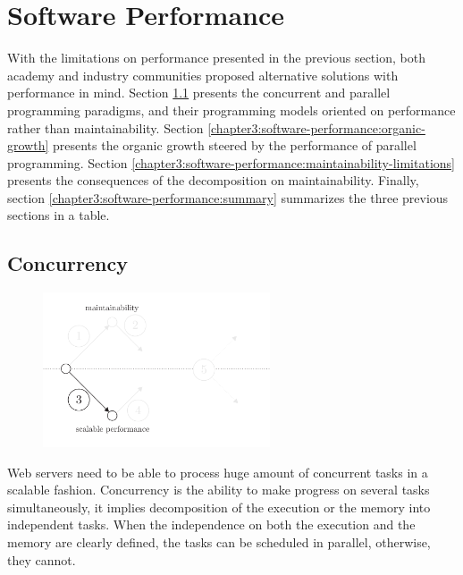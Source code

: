 \section{Software Performance} \label{chapter3:software-performance}

With the limitations on performance presented in the previous section, both academy and industry communities proposed alternative solutions with performance in mind.
Section \ref{chapter3:software-performance:concurrency} presents the concurrent and parallel programming paradigms, and their programming models oriented on performance rather than maintainability.
Section \ref{chapter3:software-performance:organic-growth} presents the organic growth steered by the performance of parallel programming.
Section \ref{chapter3:software-performance:maintainability-limitations} presents the consequences of the decomposition on maintainability.
Finally, section \ref{chapter3:software-performance:summary} summarizes the three previous sections in a table.

\subsection{Concurrency} \label{chapter3:software-performance:concurrency}

\begin{figure}[h!]  \label{fig:state-of-the-art-3}
\begin{center}
\includegraphics[width=0.6\textwidth]{../ressources/state-of-the-art-3.pdf}
\end{center}
\end{figure}

Web servers need to be able to process huge amount of concurrent tasks in a scalable fashion.
Concurrency is the ability to make progress on several tasks simultaneously, it implies decomposition of the execution or the memory into independent tasks.
When the independence on both the execution and the memory are clearly defined, the tasks can be scheduled in parallel, otherwise, they cannot.

